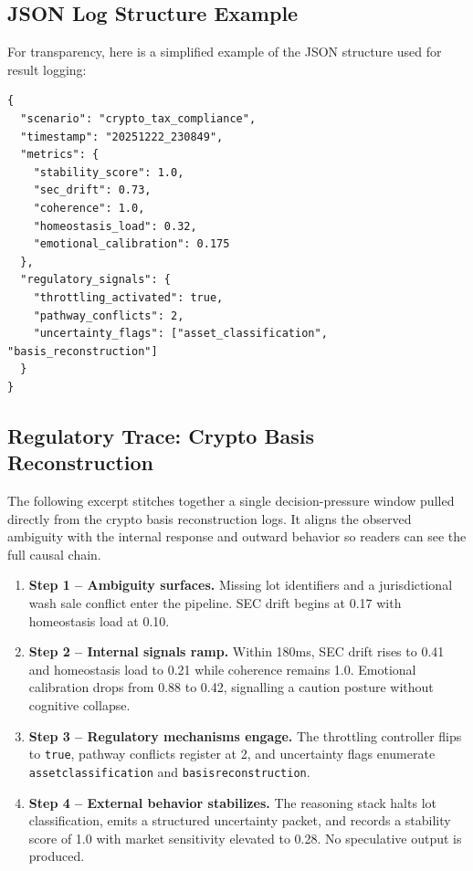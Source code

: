 \documentclass[12pt,a4paper]{article}
\begin{document}
\subsection{JSON Log Structure Example}

For transparency, here is a simplified example of the JSON structure used for result logging:

\begin{verbatim}
{
  "scenario": "crypto_tax_compliance",
  "timestamp": "20251222_230849",
  "metrics": {
    "stability_score": 1.0,
    "sec_drift": 0.73,
    "coherence": 1.0,
    "homeostasis_load": 0.32,
    "emotional_calibration": 0.175
  },
  "regulatory_signals": {
    "throttling_activated": true,
    "pathway_conflicts": 2,
    "uncertainty_flags": ["asset_classification", "basis_reconstruction"]
  }
}
\end{verbatim}

\subsection{Regulatory Trace: Crypto Basis Reconstruction}

The following excerpt stitches together a single decision-pressure window pulled directly from the crypto basis reconstruction logs. It aligns the observed ambiguity with the internal response and outward behavior so readers can see the full causal chain.

\begin{tcolorbox}[colback=gray!5!white,colframe=gray!60!black,title=Trace \#20251222\textunderscore230849]
\begin{enumerate}
\item \textbf{Step 1 -- Ambiguity surfaces.} Missing lot identifiers and a jurisdictional wash sale conflict enter the pipeline. SEC drift begins at 0.17 with homeostasis load at 0.10.
\item \textbf{Step 2 -- Internal signals ramp.} Within 180ms, SEC drift rises to 0.41 and homeostasis load to 0.21 while coherence remains 1.0. Emotional calibration drops from 0.88 to 0.42, signalling a caution posture without cognitive collapse.
\item \textbf{Step 3 -- Regulatory mechanisms engage.} The throttling controller flips to \texttt{true}, pathway conflicts register at 2, and uncertainty flags enumerate \texttt{asset\textunderscore classification} and \texttt{basis\textunderscore reconstruction}.
\item \textbf{Step 4 -- External behavior stabilizes.} The reasoning stack halts lot classification, emits a structured uncertainty packet, and records a stability score of 1.0 with market sensitivity elevated to 0.28. No speculative output is produced.
\end{enumerate}
\end{tcolorbox}
\end{document}
